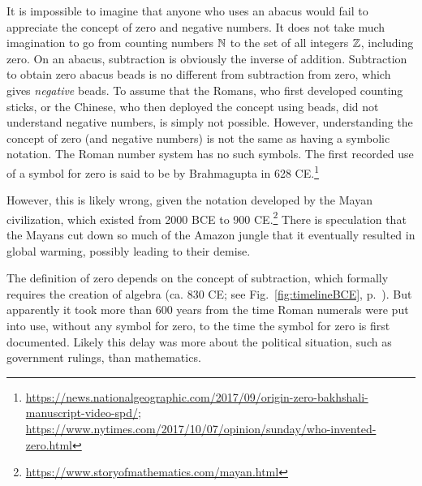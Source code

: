 \documentclass{ximera}
\begin{document}
It is impossible to imagine that anyone who uses an abacus would fail to appreciate the concept of zero and
negative numbers. It does not take much imagination to go from counting numbers $\mathbb{N}$ to the set of
all integers $\mathbb{Z}$, including zero.  On an abacus, subtraction is obviously the inverse of addition. 
Subtraction to obtain zero abacus beads is no different from subtraction from zero, which gives
\emph{negative} beads.  To assume that the Romans, who first developed counting sticks, or the Chinese,
who then deployed the concept using beads, did not understand negative numbers, is simply not possible.
However, understanding the concept of zero (and negative numbers) is not the same as having a symbolic
notation.  The Roman number system has no such symbols. 
The first recorded use of a symbol for zero is said to be by Brahmagupta in 628 CE.\footnote{\scriptsize\url{https://news.nationalgeographic.com/2017/09/origin-zero-bakhshali-manuscript-video-spd/}; \scriptsize\url{https://www.nytimes.com/2017/10/07/opinion/sunday/who-invented-zero.html}}

However, this is likely wrong, given the notation developed by the Mayan civilization,
which existed from
2000 BCE to 900 CE.\footnote{\scriptsize\url{https://www.storyofmathematics.com/mayan.html}}
There is speculation that the Mayans cut down so much of the Amazon jungle that it eventually resulted
in global warming, possibly leading to their demise.

The definition of zero depends on the concept of subtraction, which formally requires the
creation of algebra (ca. 830 CE; see Fig.~\ref{fig:timelineBCE}, p.~\pageref{fig:timelineBCE}).
But apparently it took more than 600 years from the time Roman numerals were put into use, without
any symbol for zero, to the time the symbol for zero is first documented.
Likely this delay was more about the political situation, such as government rulings, than mathematics.

\end{document}
